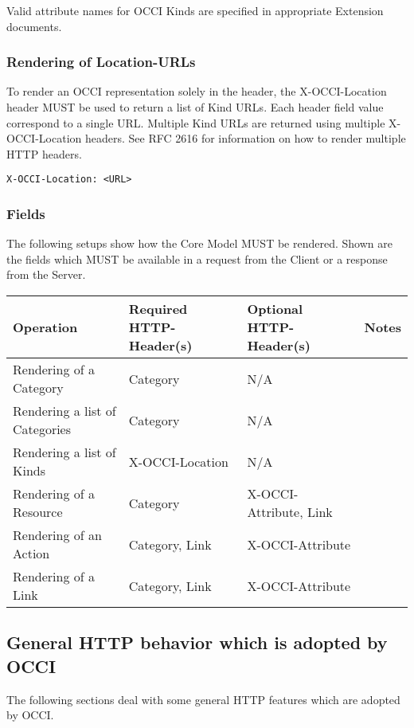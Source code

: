 \documentclass[10pt,a4paper]{article}
\begin{document}
Valid attribute names for OCCI Kinds are specified in appropriate
Extension documents.

\subsubsection{Rendering of Location-URLs}
To render an OCCI representation solely in the header, the
X-OCCI-Location header MUST be used to return a list of Kind
URLs. Each header field value correspond to a single URL. Multiple
Kind URLs are returned using multiple X-OCCI-Location headers. See RFC
2616 for information on how to render multiple HTTP headers.

\begin{verbatim}
X-OCCI-Location: <URL>
\end{verbatim}

\subsubsection{Fields}
The following setups show how the Core Model MUST be rendered. Shown
are the fields which MUST be available in a request from the Client or
a response from the Server.

\begin{tabular}{l|l|l|l}
Operation & Required HTTP-Header(s) & Optional HTTP-Header(s) & Notes \\
\hline
Rendering of a Category & Category & N/A & \\
Rendering a list of Categories & Category & N/A & \\
Rendering a list of Kinds & X-OCCI-Location & N/A & \\
Rendering of a Resource & Category & X-OCCI-Attribute, Link & \\
Rendering of an Action & Category, Link & X-OCCI-Attribute & \\
Rendering of a Link & Category, Link & X-OCCI-Attribute & \\
\end{tabular}

\subsection{General HTTP behavior which is adopted by OCCI}
The following sections deal with some general HTTP features which are
adopted by OCCI.
\end{document}
